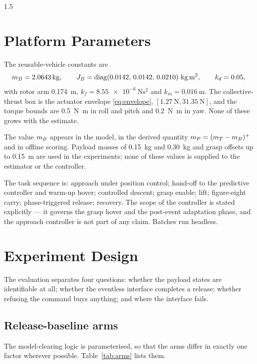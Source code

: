 \begin{spacing}{1.5}
\section{Platform Parameters}\label{sec:eval:params}

The reusable-vehicle constants are
\begin{equation}
\mB=\SI{2.0643}{\kg},\qquad
\Jb=\mathrm{diag}(0.0142,\,0.0142,\,0.0210)\ \si{\kg\meter\squared},\qquad
k_d=0.05 ,
\label{eq:platform}
\end{equation}
with rotor arm \SI{0.174}{\meter}, $k_f=\SI{8.55e-6}{\newton\second\squared}$ and
$k_m=\SI{0.016}{\meter}$. The collective-thrust box is the actuator envelope
\eqref{eq:envelope}, $[\SI{1.27}{\newton},\SI{31.35}{\newton}]$, and the torque
bounds are \SI{0.5}{\newton\meter} in roll and pitch and
\SI{0.2}{\newton\meter} in yaw. None of these grows with the estimate.

The value $m_B$ appears in the model, in the derived quantity
$m_P=(m_T-m_B)^{+}$ and in offline scoring. Payload masses of \SI{0.15}{\kg} and
\SI{0.30}{\kg} and grasp offsets up to \SI{0.15}{\meter} are used in the
experiments; none of these values is supplied to the estimator or the controller.

The task sequence is: approach under position control; hand-off to the predictive
controller and warm-up hover; controlled descent; grasp enable; lift;
figure-eight carry; phase-triggered release; recovery. The scope of the
controller is stated explicitly --- it governs the grasp hover and the
post-event adaptation phase, and the approach controller is not part of any
claim. Batches run headless.

\section{Experiment Design}\label{sec:eval:design}

The evaluation separates four questions: whether the payload states are
identifiable at all; whether the eventless interface completes a release; whether
refusing the command buys anything; and where the interface fails.

\subsection{Release-baseline arms}\label{sec:eval:arms}

The model-clearing logic is parameterised, so that the arms differ in exactly one
factor wherever possible. Table~\ref{tab:arms} lists them.


\end{spacing}
